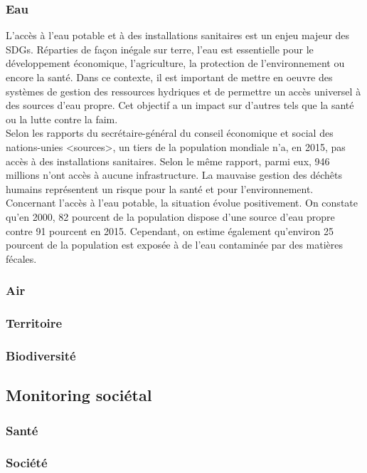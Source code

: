 \documentclass[a4paper,11pt,titlepage]{article}
\begin{document}
			\subsubsection{Eau}
				L'accès à l'eau potable et à des installations sanitaires est un enjeu majeur des SDGs. Réparties de façon inégale sur terre, l'eau est essentielle pour le développement économique, l'agriculture, la protection de l'environnement ou encore la santé. Dans ce contexte, il est important de mettre en oeuvre des systèmes de gestion des ressources hydriques et de permettre un accès universel à des sources d'eau propre. Cet objectif a un impact sur d'autres tels que la santé ou la lutte contre la faim.\\
				Selon les rapports du secrétaire-général du conseil économique et social des nations-unies <sources>, un tiers de la population mondiale n'a, en 2015, pas accès à des installations sanitaires. Selon le même rapport, parmi eux, 946 millions n'ont accès à aucune infrastructure. La mauvaise gestion des déchêts humains représentent un risque pour la santé et pour l'environnement.\\
				Concernant l'accès à l'eau potable, la situation évolue positivement. On constate qu'en 2000, 82 pourcent de la population dispose d'une source d'eau propre contre 91 pourcent en 2015. Cependant, on estime également qu'environ 25 pourcent de la population est exposée à de l'eau contaminée par des matières fécales. 
			\subsubsection{Air}
			\subsubsection{Territoire}
			\subsubsection{Biodiversité}
		
		\subsection{Monitoring sociétal}
			\subsubsection{Santé}
			\subsubsection{Société}
			
\end{document}
